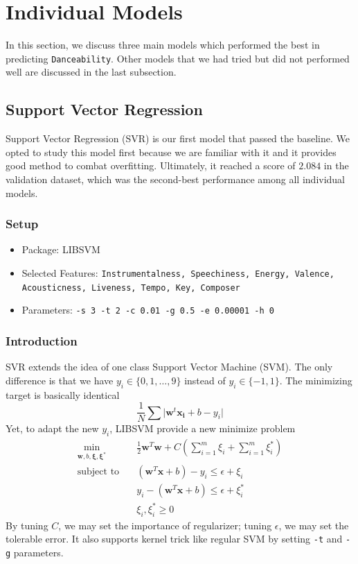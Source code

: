 \documentclass[10pt,letterpaper]{article}
\begin{document}
\section{Individual Models}

In this section, we discuss three main models which performed the best in predicting \texttt{Danceability}. Other models that we had tried but did not performed well are discussed in the last subsection. 

\subsection{Support Vector Regression}

Support Vector Regression (SVR) is our first model that passed the baseline. We opted to study this model first because we are familiar with it and it provides good method to combat overfitting. Ultimately, it reached a score of $2.084$ in the validation dataset, which was the second-best performance among all individual models. 

\subsubsection{Setup}
\begin{itemize}
	\item Package: LIBSVM
	\item Selected Features: \texttt{Instrumentalness, Speechiness, Energy, Valence, Acousticness, Liveness, Tempo, Key, Composer}
	\item Parameters: \texttt{-s 3 -t 2 -c 0.01 -g 0.5 -e 0.00001 -h 0}
\end{itemize}

\subsubsection{Introduction}

SVR extends the idea of one class Support Vector Machine (SVM). The only difference is that we have $y_i \in \{0, 1, \dots, 9\}$ instead of $y_i \in \{-1, 1\}$. The minimizing target is basically identical
$$
	\frac{1}{N} \sum \lvert \mathbf{w}^t \mathbf{x_i} + b - y_i \rvert
$$
Yet, to adapt the new $y_i$, LIBSVM provide a new minimize problem
\begin{align*}
	\underset{\mathbf{w}, b, \mathbf{\xi}, \mathbf{\xi^*}}{\min} \quad & \frac{1}{2}\mathbf{w}^T\mathbf{w} + C\left(\sum_{i=1}^m \xi_i + \sum_{i=1}^m \xi^*_i\right) \\
	\text{subject to} \quad & (\mathbf{w}^T \mathbf{x} + b) - y_i \le \epsilon + \xi_i \\
	& y_i - (\mathbf{w}^T \mathbf{x} + b) \le \epsilon + \xi^*_i \\
	& \xi_i, \xi^*_i \ge 0
\end{align*}
By tuning $C$, we may set the importance of regularizer; tuning $\epsilon$, we may set the tolerable error. It also supports kernel trick like regular SVM by setting \texttt{-t} and \texttt{-g} parameters. 
\end{document}
